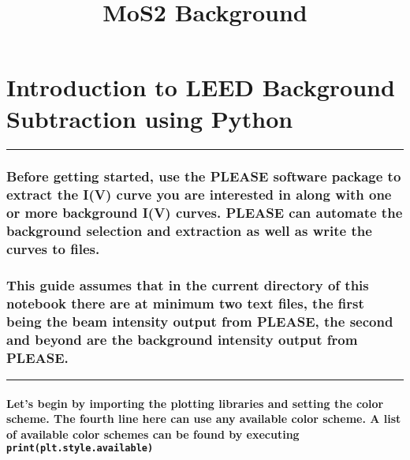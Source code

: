 \documentclass[11pt]{article}
\title{MoS2 Background}
\date{}
\begin{document}
    \maketitle




    \section{Introduction to LEED Background Subtraction using
Python}\label{introduction-to-leed-background-subtraction-using-python}

\begin{center}\rule{0.5\linewidth}{\linethickness}\end{center}

\subsubsection{Before getting started, use the PLEASE software package
to extract the I(V) curve you are interested in along with one or more
background I(V) curves. PLEASE can automate the background selection and
extraction as well as write the curves to
files.}\label{before-getting-started-use-the-please-software-package-to-extract-the-iv-curve-you-are-interested-in-along-with-one-or-more-background-iv-curves.-please-can-automate-the-background-selection-and-extraction-as-well-as-write-the-curves-to-files.}

    \subsubsection{This guide assumes that in the current directory of this
notebook there are at minimum two text files, the first being the beam
intensity output from PLEASE, the second and beyond are the background
intensity output from
PLEASE.}\label{this-guide-assumes-that-in-the-current-directory-of-this-notebook-there-are-at-minimum-two-text-files-the-first-being-the-beam-intensity-output-from-please-the-second-and-beyond-are-the-background-intensity-output-from-please.}

    \begin{center}\rule{0.5\linewidth}{\linethickness}\end{center}

    \paragraph{\texorpdfstring{Let's begin by importing the plotting
libraries and setting the color scheme. The fourth line here can use any
available color scheme. A list of available color schemes can be found
by executing
\texttt{print(plt.style.available)}}{Let's begin by importing the plotting libraries and setting the color scheme. The fourth line here can use any available color scheme. A list of available color schemes can be found by executing print(plt.style.available)}}\label{lets-begin-by-importing-the-plotting-libraries-and-setting-the-color-scheme.-the-fourth-line-here-can-use-any-available-color-scheme.-a-list-of-available-color-schemes-can-be-found-by-executing-printplt.style.available}
\end{document}
